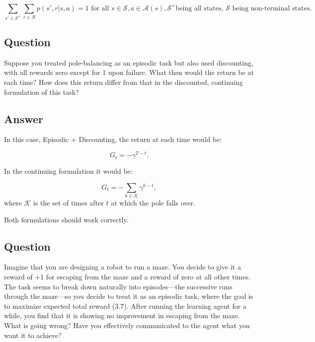 \documentclass[11pt]{article}
\begin{document}
    \begin{equation}
        \sum_{s' \in \mathcal{S}^+}^{} \sum_{r \in \mathcal{R}}^{} p(s', r | s, a) = 1 \text{ for all } s \in \mathcal{S}, a \in \mathcal{A}(s), \mathcal{S}^+ \text{being all states, } \mathcal{S} \text{ being non-terminal states}.
    \end{equation}

    \subsection{Question}

    Suppose you treated pole-balancing as an episodic task but also used discounting, with all rewards zero except for 1 upon failure.
    What then would the return be at each time?
    How does this return differ from that in the discounted, continuing formulation of this task?

    \subsection*{Answer}

    In this case, Episodic + Discounting, the return at each time would be:

    \begin{equation}
        G_t = - \gamma^{T - t}.
    \end{equation}

    In the continuing formulation it would be:

    \begin{equation}
        G_t = - \sum_{k \in \mathcal{K}} \gamma^{k - t},
    \end{equation}
    where $\mathcal{K}$ is the set of times after $t$ at which the pole falls over.

    Both formulations should work correctly.



    \subsection{Question}

    Imagine that you are designing a robot to run a maze.
    You decide to give it a reward of +1 for escaping from the maze and a reward of zero at all other times.
    The task seems to break down naturally into episodes—the successive runs through the maze—so you decide to treat it as an episodic task, where the goal is to maximize expected total reward (3.7).
    After running the learning agent for a while, you find that it is showing no improvement in escaping from the maze.
    What is going wrong?
    Have you effectively communicated to the agent what you want it to achieve?
\end{document}
